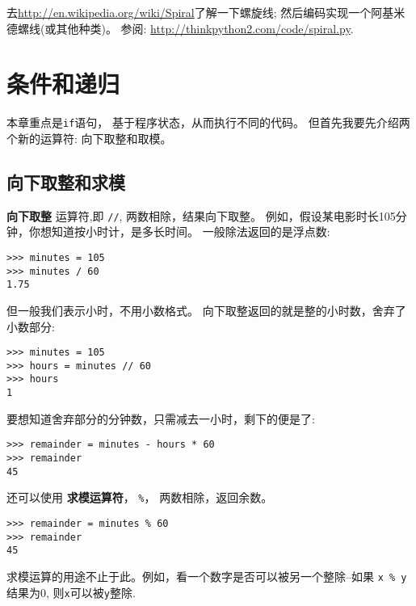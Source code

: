 \documentclass[10pt]{book}
\begin{document}
\begin{exercise}

去\url{http://en.wikipedia.org/wiki/Spiral}了解一下螺旋线;
然后编码实现一个阿基米德螺线(或其他种类)。
参阅: \url{http://thinkpython2.com/code/spiral.py}.

\end{exercise}


\chapter{条件和递归}

本章重点是{\tt if}语句，
基于程序状态，从而执行不同的代码。
但首先我要先介绍两个新的运算符: 向下取整和取模。

\section{向下取整和求模}

{\bf 向下取整} 运算符,即 \verb"//", 
两数相除，结果向下取整。
例如，假设某电影时长105分钟，你想知道按小时计，是多长时间。
一般除法返回的是浮点数:

\begin{verbatim}
>>> minutes = 105
>>> minutes / 60
1.75
\end{verbatim}

但一般我们表示小时，不用小数格式。
向下取整返回的就是整的小时数，舍弃了小数部分:

\begin{verbatim}
>>> minutes = 105
>>> hours = minutes // 60
>>> hours
1
\end{verbatim}

要想知道舍弃部分的分钟数，只需减去一小时，剩下的便是了:

\begin{verbatim}
>>> remainder = minutes - hours * 60
>>> remainder
45
\end{verbatim}


还可以使用 {\bf 求模运算符}， \verb"%"， 
两数相除，返回余数。

\begin{verbatim}
>>> remainder = minutes % 60
>>> remainder
45
\end{verbatim}
%
求模运算的用途不止于此。例如，看一个数字是否可以被另一个整除--如果
{\tt x \% y}结果为0, 则{\tt x}可以被{\tt y}整除.
\end{document}
